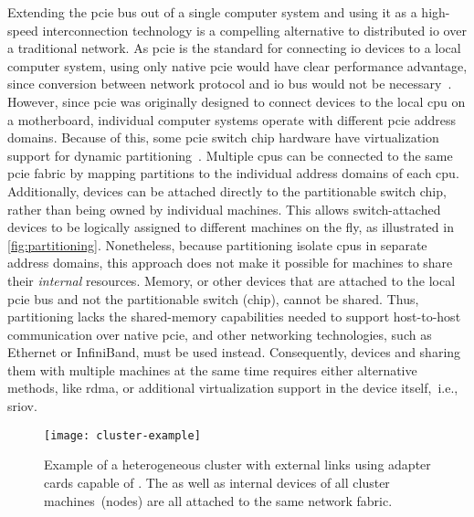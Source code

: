 Extending the \gls{pcie} bus out of a single computer system and using it as a high-speed interconnection technology is a compelling alternative to distributed \gls{io} over a traditional network.
%
As \gls{pcie} is the standard for connecting \gls{io} devices to a local computer system, using only native \gls{pcie} would have clear performance advantage, since conversion between network protocol and \gls{io} bus would not be necessary~\cite{Fountain2005,Ravindran2008,whitepaper:Regula2004}.
%
However, since \gls{pcie} was originally designed to connect devices to the local \gls{cpu} on a motherboard, individual computer systems operate with different \gls{pcie} address domains.
%
Because of this, some \gls{pcie} switch chip hardware have virtualization support for dynamic partitioning~\cite{Chung2018,whitepaper:IDT,whitepaper:Microsemi,url:rackscale,url:liqid,url:gigaio}. 
%
Multiple \glspl{cpu} can be connected to the same \gls{pcie} fabric by mapping partitions to the individual address domains of each \gls{cpu}.
%
Additionally, devices can be attached directly to the partitionable switch chip, rather than being owned by individual machines.
%
This allows switch-attached devices to be logically assigned to different machines on the fly, as illustrated in \cref{fig:partitioning}.
%
Nonetheless, because partitioning isolate \glspl{cpu} in separate address domains, this approach does not make it possible for machines to share their \emph{internal} resources.
%
Memory, or other devices that are attached to the local \gls{pcie} bus and not the partitionable switch (chip), cannot be shared.
%
Thus, partitioning lacks the shared-memory capabilities needed to support host-to-host communication over native \gls{pcie}, and other networking technologies, such as Ethernet or InfiniBand, must be used instead.
%
Consequently,  devices and sharing them with multiple machines at the same time requires either alternative methods, like \gls{rdma}, or additional virtualization support in the device itself,~i.e., \gls{sriov}.




\begin{figure}
	\centering
    \texttt{[image: cluster-example]}
    \caption[Example of a heterogeneous -networked cluster with  adapter cards and external cables]{Example of a heterogeneous  cluster with external  links using adapter cards capable of . The  as well as internal devices of all cluster machines~(nodes) are all attached to the same  network fabric.}
  	\label{fig:cluster-example}
\end{figure}



